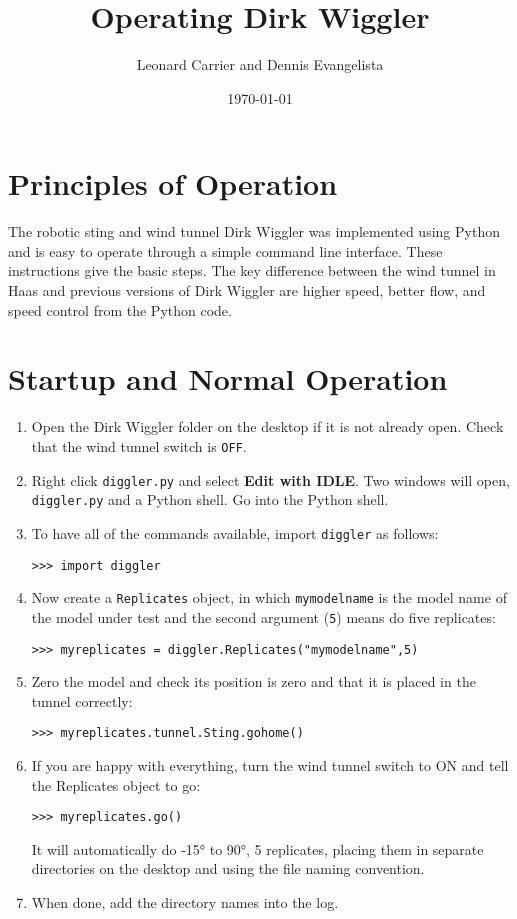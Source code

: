 \documentclass{article}
\author{Leonard Carrier and Dennis Evangelista}
\title{Operating Dirk Wiggler}
\date{\today}
\begin{document}
\maketitle

\section{Principles of Operation}
The robotic sting and wind tunnel Dirk Wiggler was implemented using Python and is easy to operate through a simple command line interface.  These instructions give the basic steps. The key difference between the wind tunnel in Haas and previous versions of Dirk Wiggler are higher speed, better flow, and speed control from the Python code. 

\section{Startup and Normal Operation}
\begin{enumerate}
\item{Open the Dirk Wiggler folder on the desktop if it is not already open. Check that the wind tunnel switch is {\tt OFF}.}


\item{Right click {\tt diggler.py} and select {\bf Edit with IDLE}.  Two windows will open, {\tt diggler.py} and a Python shell.  Go into the Python shell.}


\item{To have all of the commands available, import {\tt diggler} as follows:
\begin{verbatim}
>>> import diggler
\end{verbatim}
}

\item{Now create a {\tt Replicates} object, in which {\tt mymodelname} is the model name of the model under test and the second argument ({\tt 5}) means do five replicates:
\begin{verbatim}
>>> myreplicates = diggler.Replicates("mymodelname",5)
\end{verbatim}
}

\item{Zero the model and check its position is zero and that it is placed in the tunnel correctly:
\begin{verbatim}
>>> myreplicates.tunnel.Sting.gohome()
\end{verbatim}}

\item{If you are happy with everything, turn the wind tunnel switch to ON and tell the Replicates object to go:
\begin{verbatim}
>>> myreplicates.go()
\end{verbatim}
It will automatically do \ang{-15} to \ang{90}, 5 replicates, placing them in separate directories on the desktop and using the file naming convention.}

\item{When done, add the directory names into the log.}

\end{enumerate}
\end{document}
